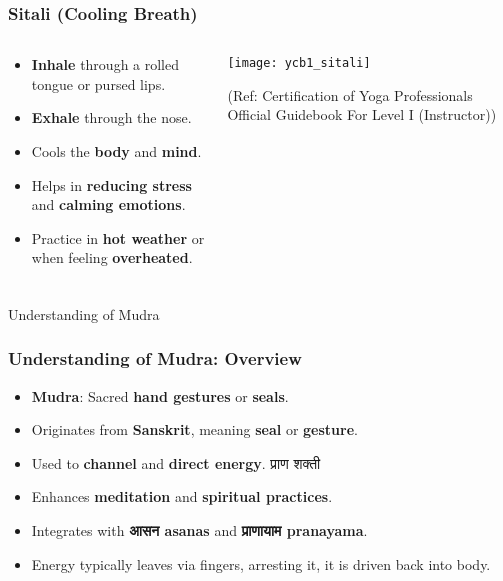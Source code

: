 \begin{frame}[fragile]\frametitle{Sitali (Cooling Breath)}
\begin{columns}
    \begin{column}[T]{0.5\linewidth}
      \begin{itemize}
        \item \textbf{Inhale} through a rolled tongue or pursed lips.
        \item \textbf{Exhale} through the nose.
        \item Cools the \textbf{body} and \textbf{mind}.
        \item Helps in \textbf{reducing stress} and \textbf{calming emotions}.
        \item Practice in \textbf{hot weather} or when feeling \textbf{overheated}.
      \end{itemize}
    \end{column}
    \begin{column}[T]{0.5\linewidth}
        \begin{center}
        \texttt{[image: ycb1\_sitali]}
				
		{\tiny (Ref: Certification  of Yoga Professionals Official Guidebook For Level I (Instructor))}	 
        \end{center}	
    \end{column}
\end{columns}
\end{frame}


\begin{frame}[fragile]\frametitle{}
\begin{center}
{\Large Understanding of Mudra}
\end{center}
\end{frame}

\begin{frame}[fragile]\frametitle{Understanding of Mudra: Overview}

      \begin{itemize}
        \item \textbf{Mudra}: Sacred \textbf{hand gestures} or \textbf{seals}.
        \item Originates from \textbf{Sanskrit}, meaning \textbf{seal} or \textbf{gesture}.
        \item Used to \textbf{channel} and \textbf{direct energy}.  प्राण शक्ती 
        \item Enhances \textbf{meditation} and \textbf{spiritual practices}.
        \item Integrates with \textbf{आसन   asanas} and \textbf{प्राणायाम  pranayama}.
		\item Energy typically leaves via fingers, arresting it, it is driven back into body.
      \end{itemize}
\end{frame}

